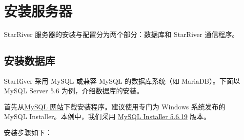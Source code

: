 \section{安装服务器}\label{ux5b89ux88c5ux670dux52a1ux5668}

StarRiver 服务器的安装与配置分为两个部分：数据库和 StarRiver 通信程序。

\subsection{安装数据库}\label{ux5b89ux88c5ux6570ux636eux5e93}

StarRiver 采用 MySQL 或兼容 MySQL 的数据库系统（如 MariaDB）。下面以
MySQL Server 5.6 为例，介绍数据库的安装。

首先从\href{http://dev.mysql.com/downloads/mysql/}{MySQL
网站}下载安装程序。建议使用专门为 Windows 系统发布的 MySQL
Installer。本例中，我们采用
\href{http://dev.mysql.com/downloads/windows/installer/5.6.html}{MySQL
Installer 5.6.19} 版本。

安装步骤如下：

